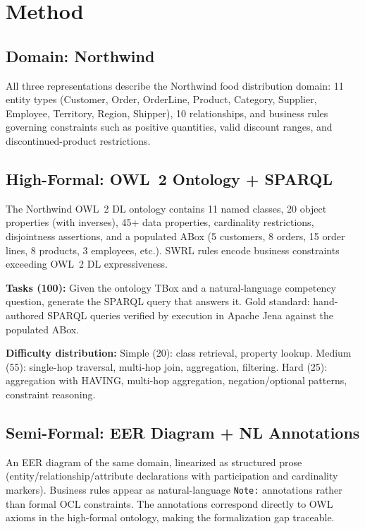 \documentclass[runningheads]{llncs}
\begin{document}
\section{Method}
\label{sec:method}

\subsection{Domain: Northwind}

All three representations describe the Northwind food distribution domain: 11 entity types (Customer, Order, OrderLine, Product, Category, Supplier, Employee, Territory, Region, Shipper), 10 relationships, and business rules governing constraints such as positive quantities, valid discount ranges, and discontinued-product restrictions.

\subsection{High-Formal: OWL~2 Ontology + SPARQL}

The Northwind OWL~2 DL ontology contains 11 named classes, 20 object properties (with inverses), 45+ data properties, cardinality restrictions, disjointness assertions, and a populated ABox (5 customers, 8 orders, 15 order lines, 8 products, 3 employees, etc.). SWRL rules encode business constraints exceeding OWL~2 DL expressiveness.

\textbf{Tasks (100):} Given the ontology TBox and a natural-language competency question, generate the SPARQL query that answers it. Gold standard: hand-authored SPARQL queries verified by execution in Apache Jena against the populated ABox.

\textbf{Difficulty distribution:} Simple (20): class retrieval, property lookup. Medium (55): single-hop traversal, multi-hop join, aggregation, filtering. Hard (25): aggregation with HAVING, multi-hop aggregation, negation/optional patterns, constraint reasoning.

\subsection{Semi-Formal: EER Diagram + NL Annotations}

An EER diagram of the same domain, linearized as structured prose (entity/relationship/attribute declarations with participation and cardinality markers). Business rules appear as natural-language \texttt{Note:} annotations rather than formal OCL constraints. The annotations correspond directly to OWL axioms in the high-formal ontology, making the formalization gap traceable.
\end{document}
